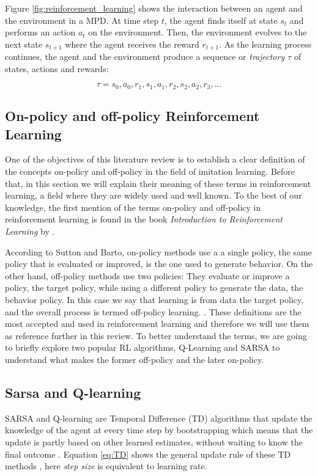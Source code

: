 Figure \ref{fig:reinforcement_learning} shows the interaction between an agent and the environment in a MPD. At time step $t$, the agent finds itself at state $s_t$ and performs an action $a_t$ on the environment. Then, the environment evolves to the next state $s_{t+1}$ where the agent receives the reward $r_{t+1}$. As the learning process continues, the agent and the environment produce a sequence or \textit{trajectory $\tau$} of states, actions and rewards:


\begin{equation}
\tau = s_0, a_0, r_1,s_1, a_1, r_2,s_2, a_2, r_3, ...
\label{eq:transition}
\end{equation}


\subsection{On-policy and off-policy Reinforcement Learning}
\label{subsection:on and off-policy Reinforcement Learning}

One of the objectives of this literature review is to establish a clear definition of the concepts on-policy and off-policy in the field of imitation learning. Before that, in this section we will explain their meaning of these terms in reinforcement learning, a field where they are widely used and well known. To the best of our knowledge, the first mention of the terms on-policy and off-policy in reinforcement learning is found in the book \textit{Introduction to Reinforcement Learning} by \cite{Sutton:1998}.

According to Sutton and Barto, on-policy methods use a a single policy, the same policy that is evaluated or improved, is the one used to generate behavior. On the other hand, off-policy methods use two policies: They evaluate or improve a policy, the target policy, while using a different policy to generate the data, the behavior policy. In this case we say that learning is from data  the target policy, and the overall process is termed off-policy learning. \cite{Sutton:1998}. These definitions are the most accepted and used in reinforcement learning and therefore we will use them as reference further in this review. To better understand the terms, we are going to briefly explore two popular RL algorithms, Q-Learning and SARSA to understand what makes the former off-policy and the later on-policy.

\subsection*{Sarsa and Q-learning}
SARSA and Q-learning are Temporal Difference (TD) algorithms that update the knowledge of the agent at every time step by bootstrapping which means that the update is partly based on other learned estimates, without waiting to know the final outcome \cite{Sutton:1998}. Equation \eqref{eq:TD} shows the general update rule of these TD methods \cite{TD:equation:2019}, here \textit{step size} is equivalent to learning rate.


